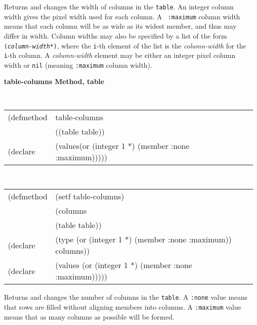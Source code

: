 \begin{flushright} \parbox[t]{6.125in}{
Returns and changes the width of columns in the {\tt table}. An integer column
width gives the pixel width used for each column.  A {\tt
:maximum} column width means that each column will be as wide as its widest member,
and thus may differ in width. Column widths may also be specified by a
list of the form {\tt ({\em column-width*})}, where the {\tt i}-th element of
the list is the {\em column-width} for the {\tt i}-th column. A {\em
column-width} element may be either an integer pixel column width or {\tt nil}
(meaning {\tt :maximum} column width).

}\end{flushright}

	  
{\samepage
{\large {\bf table-columns \hfill Method, table}}
\begin{flushright} \parbox[t]{6.125in}{
\tt
\begin{tabular}{lll}
\raggedright
(defmethod & table-columns & \\
& ((table  table)) \\
(declare & (values(or (integer 1 *) (member :none :maximum)))))
\end{tabular}
\rm

}\end{flushright}}

{\samepage
\begin{flushright} \parbox[t]{6.125in}{
\tt
\begin{tabular}{lll}
\raggedright
(defmethod & (setf table-columns) & \\
         & (columns \\
         & (table table)) \\
(declare &(type (or (integer 1 *) (member :none :maximum))  columns))\\
(declare & (values (or (integer 1 *) (member :none :maximum)))))
\end{tabular}
\rm
}
\end{flushright}}


\begin{flushright} \parbox[t]{6.125in}{
Returns and changes the number of columns in the {\tt table}. A {\tt :none} value
means that rows are filled without aligning members into columns. A {\tt :maximum}
value means that as many columns as possible will be formed.

}\end{flushright}

